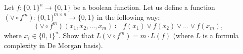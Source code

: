 Let $f\colon \{0, 1\}^n \to \{0, 1\}$ be a boolean function. Let us define a function
$\left( \vee \circ f^m \right)\colon \{0, 1\}^{m \times n} \to \{0, 1\}$ in the following way:
$$
    \left( \vee \circ f^m \right)(x_1, x_2, \dots, x_m) \coloneqq f(x_1) \lor f(x_2) \lor \dots \lor
    f(x_m),
$$
where $x_i \in \{0, 1\}^n$. Show that $L\left( \vee \circ f^m \right) = m \cdot L(f)$ (where $L$ is a
formula complexity in De Morgan basis).